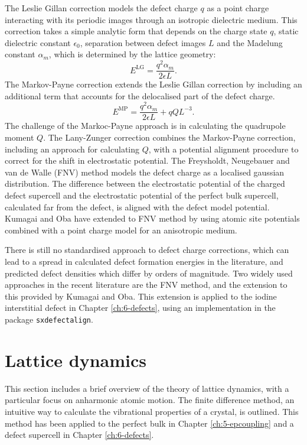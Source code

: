 The Leslie Gillan correction\autocite{Leslie1985} models the defect charge $q$ as a point charge interacting with its periodic images through an isotropic dielectric medium. 
This correction takes a simple analytic form that depends on the charge state  $q$, static dielectric constant $\epsilon_0$, separation between defect images $L$ and the Madelung constant $\alpha_m$, which is determined by the lattice geometry:
\begin{equation}
    E^\mathrm{LG} = \frac{q^2\alpha_{m}}{2\epsilon L}.
\end{equation}
The Markov-Payne correction extends the Leslie Gillan correction by including an additional term that accounts for the delocalised part of the defect charge. 
\begin{equation}
    E^\mathrm{MP} = \frac{q^2\alpha_{m}}{2\epsilon L} + qQL^{-3}. 
\end{equation}
The challenge of the Markoc-Payne approach is in calculating the quadrupole moment $Q$. 
The Lany-Zunger correction\autocite{Lany2009} combines the Markov-Payne correction, including an approach for calculating $Q$, with a potential alignment procedure to correct for the shift in electrostatic potential. 
The Freysholdt, Neugebauer and van de Walle (FNV) method\autocite{Freysoldt2009} models the defect charge as a localised gaussian distribution. 
The difference between the electrostatic potential of the charged defect supercell and the electrostatic potential of the perfect bulk supercell, calculated far from the defect, is aligned with the defect model potential. 
Kumagai and Oba have extended to FNV method by using atomic site potentials combined with a point charge model for an anisotropic medium.\autocite{Kumagai2014} 

There is still no standardised approach to defect charge corrections, 
which can lead to a spread in calculated defect formation energies in the literature, and predicted defect densities which differ by orders of magnitude.
Two widely used approaches in the recent literature are the FNV method, and the extension to this provided by Kumagai and Oba.
This extension is applied to the iodine interstitial defect in Chapter \ref{ch:6-defects}, using an implementation in the package \texttt{sxdefectalign}.


\section{Lattice dynamics} \label{sec:latticedynamics}
This section includes a brief overview of the theory of lattice dynamics, with a particular focus on anharmonic atomic motion. The finite difference method, an intuitive way to calculate the vibrational properties of a crystal, is outlined. This method has been applied to the perfect bulk in Chapter \ref{ch:5-epcoupling} and a defect supercell in Chapter \ref{ch:6-defects}.

